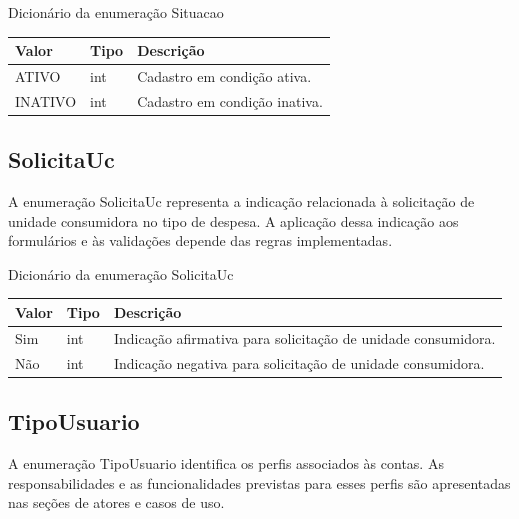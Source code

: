 \begingroup
\small
\setlength{\tabcolsep}{4pt}
\setlength{\LTcapwidth}{\textwidth}
\setlength{\larguracolunascivitas}{\dimexpr\textwidth-6\tabcolsep-4\arrayrulewidth\relax}
\begin{quadro}[H]
\centering
\caption{Dicionário da enumeração Situacao}\label{qua:cap3-13}
\begin{tabular}{|P{0.31\larguracolunascivitas}|P{0.15\larguracolunascivitas}|P{0.54\larguracolunascivitas}|}
\hline
\textbf{Valor} & \textbf{Tipo} & \textbf{Descrição} \\ \hline
ATIVO & int & Cadastro em condição ativa. \\ \hline
INATIVO & int & Cadastro em condição inativa. \\ \hline
\end{tabular}
\end{quadro}
\endgroup

\subsection{SolicitaUc}
A enumeração SolicitaUc representa a indicação relacionada à solicitação de unidade consumidora no tipo de despesa. A aplicação dessa indicação aos formulários e às validações depende das regras implementadas.

\begingroup
\small
\setlength{\tabcolsep}{4pt}
\setlength{\LTcapwidth}{\textwidth}
\setlength{\larguracolunascivitas}{\dimexpr\textwidth-6\tabcolsep-4\arrayrulewidth\relax}
\begin{quadro}[H]
\centering
\caption{Dicionário da enumeração SolicitaUc}\label{qua:cap3-14}
\begin{tabular}{|P{0.31\larguracolunascivitas}|P{0.15\larguracolunascivitas}|P{0.54\larguracolunascivitas}|}
\hline
\textbf{Valor} & \textbf{Tipo} & \textbf{Descrição} \\ \hline
Sim & int & Indicação afirmativa para solicitação de unidade consumidora. \\ \hline
Não & int & Indicação negativa para solicitação de unidade consumidora. \\ \hline
\end{tabular}
\end{quadro}
\endgroup

\subsection{TipoUsuario}
A enumeração TipoUsuario identifica os perfis associados às contas. As responsabilidades e as funcionalidades previstas para esses perfis são apresentadas nas seções de atores e casos de uso.

